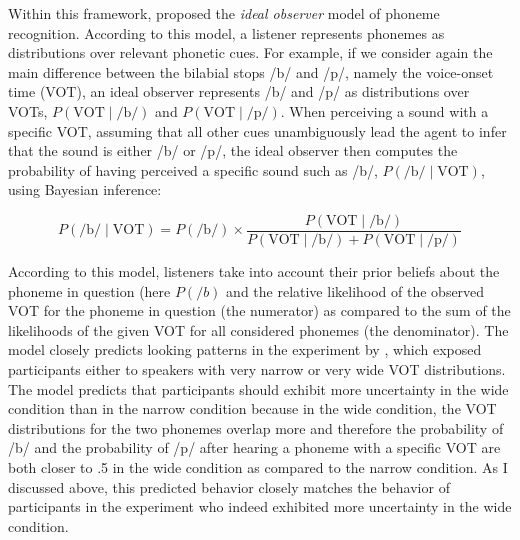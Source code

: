 Within this framework, \textcite{Clayards2008} proposed the \textit{ideal observer} model of phoneme recognition. According to this model, a listener represents phonemes as distributions
over relevant phonetic cues. For example, if we consider again the main difference between the bilabial stops /b/ and /p/, namely the voice-onset time (VOT), an ideal observer represents 
/b/ and /p/ as distributions over VOTs, $P(\mbox{VOT}\mid \mbox{/b/})$ and $P(\mbox{VOT}\mid \mbox{/p/})$. When perceiving a sound with a specific VOT, assuming that all other cues 
unambiguously lead the agent to infer that the sound is either /b/ or /p/, the ideal observer then computes the probability of
having perceived a specific sound such as /b/, $P(\mbox{/b/} \mid \mbox{VOT})$, using Bayesian inference:

$$ P(\mbox{/b/} \mid \mbox{VOT}) = P(\mbox{/b/}) \times \frac{P(\mbox{VOT}\mid \mbox{/b/})}{P(\mbox{VOT}\mid \mbox{/b/}) + P(\mbox{VOT}\mid \mbox{/p/})}   $$

\noindent According to this model, listeners take into account their prior beliefs about the phoneme in question (here $P(/b)$ and the relative likelihood of the observed VOT for the phoneme in question (the numerator) as compared to
the sum of the likelihoods of the given VOT for all considered phonemes (the denominator). The model closely predicts looking patterns in the experiment by 
\citeauthor{Clayards2008}, which exposed participants either to speakers with very narrow or very wide VOT distributions.
 The model predicts that participants should exhibit more uncertainty in the wide condition than in the narrow condition because in the wide condition, the VOT distributions for the two phonemes
 overlap more and therefore the probability of /b/ and the probability of /p/ after hearing a phoneme with a specific VOT are both closer to .5 in the wide condition as compared to the narrow condition. 
 As I discussed above, this predicted behavior closely matches the behavior of participants in the experiment who indeed exhibited more uncertainty in the wide condition.
 
